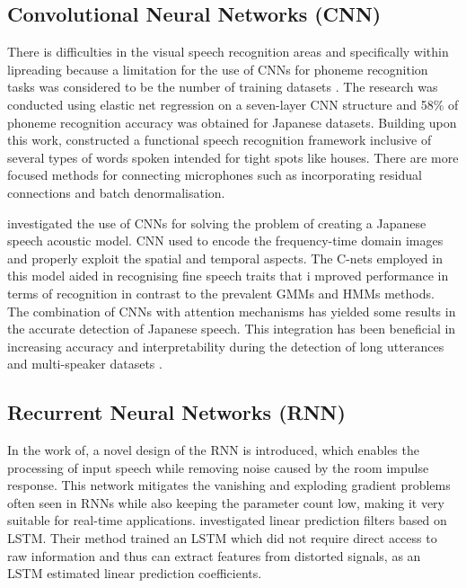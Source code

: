 \subsection{Convolutional Neural Networks (CNN)}
There is difficulties in the visual speech recognition areas and specifically within lipreading because a limitation for the use of CNNs for phoneme recognition tasks was considered to be the number of training datasets \parencite{noda2014lipreading}. The research was conducted using elastic net regression on a seven-layer CNN structure and 58\% of phoneme recognition accuracy was obtained for Japanese datasets. Building upon this work, \textcite{yalta2019cnn} constructed a functional speech recognition framework inclusive of several types of words spoken intended for tight spots like houses. There are more focused methods for connecting microphones such as incorporating residual connections and batch denormalisation. 

\textcite{noda2014lipreading} investigated the use of CNNs for solving the problem of creating a Japanese speech acoustic model. CNN used to encode the frequency-time domain images and properly exploit the spatial and temporal aspects. The C-nets employed in this model aided in recognising fine speech traits that i mproved performance in terms of recognition in contrast to the prevalent GMMs and HMMs methods. The combination of CNNs with attention mechanisms has yielded some results in the accurate detection of Japanese speech. This integration has been beneficial in increasing accuracy and interpretability during the detection of long utterances and multi-speaker datasets \parencite{Mukohara2015Emotion}.


\subsection{Recurrent Neural Networks (RNN)}
In the work of\textcite{takeuchi2020real}, a novel design of the RNN is introduced, which enables the processing of input speech while removing noise caused by the room impulse response. This network mitigates the vanishing and exploding gradient problems often seen in RNNs while also keeping the parameter count low, making it very suitable for real-time applications. \textcite{Kida2016LSTM} investigated linear prediction filters based on LSTM. Their method trained an LSTM which did not require direct access to raw information and thus can extract features from distorted signals, as an LSTM estimated linear prediction coefficients. 

